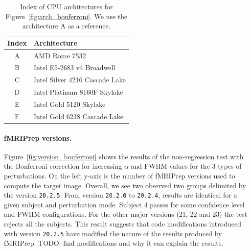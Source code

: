 \documentclass{article}
\newcommand{\TODO}[1]{\color{red}\textsc{TODO:} #1\color{black}\xspace}
\newcommand{\fmriprep}{fMRIPrep\xspace}
\begin{document}
\begin{table}
    \begin{center}
        \begin{tabular}{c|l}
            Index & Architecture                   \\
            \hline
            A     & AMD Rome 7532                  \\
            B     & Intel E5-2683 v4 Broadwell     \\
            C     & Intel Silver 4216 Cascade Lake \\
            D     & Intel Platinum 8160F Skylake   \\
            E     & Intel Gold 5120 Skylake        \\
            F     & Intel Gold 6238 Cascade Lake
        \end{tabular}
    \end{center}
    \caption{Index of CPU architectures for Figure~\ref{fig:arch_bonferroni}. We use the architecture A as a reference.}
    \label{tab:index-arch-map}
\end{table}

\paragraph*{\fmriprep versions.} Figure~\ref{fig:version_bonferroni} shows the results of the non-regression test with the Bonferroni correction for increasing $\alpha$ and FWHM values for the 3 types of perturbations. On the left y-axis is the number of \fmriprep versions used to compute the target image. Overall, we see two observed two groups delimited by the version \texttt{20.2.5}. From version \texttt{20.2.0} to \texttt{20.2.4}, results are identical for a given subject and perturbation mode. Subject 4 passes for some confidence level and FWHM configurations. For the other major versions (21, 22 and 23) the test rejects all the subjects. This result suggests that code modifications introduced with version \texttt{20.2.5} have modified the nature of the results produced by \fmriprep. \TODO{find modifications and why it can explain the results}.
\end{document}
